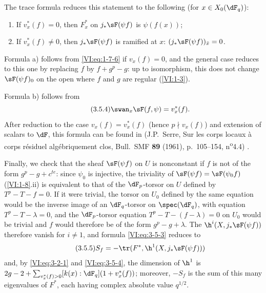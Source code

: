 The trace formula reduces this statement to the following (for 
$x\in X_0(\dF_q)$): 
\begin{enumerate}[\indent a)]
  \item If $v_x^\ast(f)=0$, then $F_x^\ast$ on $j_\ast \sF(\psi f)$ is 
    $\psi(f(x))$; 
  \item If $v_x^\ast(f)\ne 0$, then $j_\ast \sF(\psi f)$ is ramified at $x$: 
    $(j_\ast \sF(\psi f))_{\bar x}=0$. 
\end{enumerate}

Formula a) follows from \eqref{VI:eq:1-7-6} if $v_x(f)=0$, and the general 
case reduces to this one by replacing $f$ by $f+g^p-g$: up to isomorphism, this 
does not change $\sF(\psi f)_0$ on the open where $f$ and $g$ are regular 
(\ref{VI:1-3}). 

Formula b) follows from 
\begin{equation*}\tag{3.5.4}\label{VI:eq:3-5-4}
  \swan_x \sF(f,\psi) = v_x^\ast(f) \text{.} 
\end{equation*}
After reduction to the case $v_x(f)=v_x^\ast(f)$ (hence $p\nmid v_x(f)$) 
and extension of scalars to $\dF$, this formula can be found in 
(J.P.~Serre, Sur les corps locaux à corps résiduel algébriquement clos, Bull.~SMF \textbf{89} (1961), p.~105--154, n\textsuperscript{o}4.4) \cite[4.4]{se61}.

Finally, we check that the sheaf $\sF(\psi f)$ on $U$ is nonconstant if 
$f$ is not of the form $g^p-g+c^{t e}$: since $\psi_0$ is injective, the 
triviality of $\sF(\psi f)=\sF(\psi_0 f)$ (\ref{VI:1-8}.ii) is equivalent to 
that of the $\dF_p$-torsor on $U$ defined by $T^p-T-f=0$. If it were trivial, 
the torsor on $U_0$ defined by the same equation 
would be the inverse image of an 
$\dF_q$-torsor on $\spec(\dF_q)$, with equation $T^p-T-\lambda=0$, and the 
$\dF_p$-torsor equation $T^p-T-(f-\lambda)=0$ on $U_0$ would be trivial 
and $f$ would therefore be of the form $g^p-g+\lambda$. The 
$\h^i(X,j_\ast \sF(\psi f))$ therefore vanish for $i\ne 1$, and formula 
\eqref{VI:eq:3-5-3} reduces to 
\begin{equation*}\tag{3.5.5}\label{VI:eq:3-5-5}
  S_f = -\tr(F^\ast,\h^1(X,j_\ast \sF(\psi f))) 
\end{equation*}
and, by \eqref{VI:eq:3-2-1} and \eqref{VI:eq:3-5-4}, the dimension of $\h^1$ is 
$2 g-2+\sum_{v_x^\ast(f)>0} [k(x):\dF_q](1+v_x^\ast(f))$; moreover, $-S_f$ 
is the sum of this many eigenvalues of $F^\ast$, each having complex 
absolute value $q^{1/2}$. 






